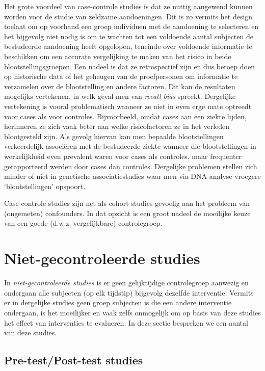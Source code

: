 \documentclass[
  12pt,dutch,coursenotes]{book}
\theoremstyle{definition}
\theoremstyle{definition}
\theoremstyle{definition}
\theoremstyle{definition}
\theoremstyle{remark}
\begin{document}
Het grote voordeel van case-controle studies is dat ze nuttig aangewend
kunnen worden voor de studie van zeldzame aandoeningen. Dit is zo vermits
het design toelaat om op voorhand een groep individuen met de aandoening te
selecteren en het bijgevolg niet nodig is om te wachten tot een voldoende
aantal subjecten de bestudeerde aandoening heeft opgelopen, teneinde over voldoende informatie te beschikken om een accurate vergelijking te maken van het risico in beide blootstellingsgroepen. Een nadeel is
dat ze retrospectief zijn en dus beroep doen op historische data of het
geheugen van de proefpersonen om informatie te verzamelen over de
blootstelling en andere factoren. Dit kan de resultaten mogelijks
vertekenen, in welk geval men van \emph{recall bias} spreekt. Dergelijke
vertekening is vooral problematisch wanneer ze niet in even erge mate
optreedt voor cases als voor controles. Bijvoorbeeld, omdat cases aan een
ziekte lijden, herinneren ze zich vaak beter aan welke risicofactoren ze in
het verleden blootgesteld zijn. Als gevolg hiervan kan men bepaalde
blootstellingen verkeerdelijk associëren met de bestudeerde ziekte wanneer
die blootstellingen in werkelijkheid even prevalent waren voor cases als
controles, maar frequenter gerapporteerd werden door cases dan controles. Dergelijke problemen stellen zich minder of niet in genetische associatiestudies waar men via DNA-analyse vroegere `blootstellingen' opspoort.

Case-controle studies zijn net als cohort studies gevoelig aan het probleem
van (ongemeten) confounders. In dat opzicht is een groot nadeel de moeilijke
keuze van een goede (d.w.z. vergelijkbare) controlegroep.

\hypertarget{niet-gecontroleerde-studies}{%
\section{Niet-gecontroleerde studies}\label{niet-gecontroleerde-studies}}

In \emph{niet-gecontroleerde studies} is er geen gelijktijdige controlegroep aanwezig en
ondergaan alle subjecten (op elk tijdstip) bijgevolg dezelfde interventie. Vermits er in
dergelijke studies geen groep subjecten is die een andere interventie
ondergaan, is het moeilijker en vaak zelfs onmogelijk om op basis van deze
studies het effect van interventies te evalueren. In deze sectie bespreken we een aantal van deze studies.

\hypertarget{subsec:prepost}{%
\subsection{Pre-test/Post-test studies}\label{subsec:prepost}}
\end{document}

